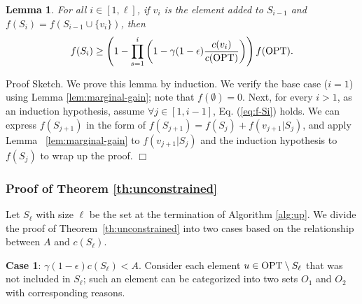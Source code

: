 \documentclass[10pt]{article} %
\newtheorem{lemma}[theorem]{Lemma}
\theoremstyle{remark}
\newcommand{\OPT}{{\rm OPT}}
\begin{document}
\begin{lemma}
\label{lem:f-Si}
For all $i\in [1,\ell]$, if $v_i$ is the element added to $S_{i-1}$ and $f(S_{i})=f(S_{i-1} \cup \{v_i\})$, then
\begin{equation}
    \label{eq:f-Si}
    f(S_{i}) \geq \left(   1- \prod_{s=1}^{i} \left(1- \gamma(1-\epsilon) \frac{c(v_i)}{c(\OPT)} \right)   \right) f(\OPT).
\end{equation}
\end{lemma}

{\sc Proof Sketch.}
We prove this lemma by induction. We verify the base case ($i=1$) using Lemma \ref{lem:marginal-gain}; note that
$f(\emptyset) = 0$. Next, for every $i>1$, as an induction hypothesis, assume $\forall j \in [1, i-1]$, Eq. (\ref{eq:f-Si}) holds. We can express $f(S_{j+1})$ in the form of $f(S_{j+1}) = f(S_j)+f(v_{j+1}|S_j)$, and apply Lemma ~\ref{lem:marginal-gain} to $f(v_{j+1}|S_j)$ and the induction hypothesis to $f(S_j)$ to wrap up the proof. \hfill $\Box$


\subsubsection{Proof of Theorem \ref{th:unconstrained} }

Let $S_\ell$ with size $\ell$ be the set at the termination of Algorithm \ref{alg:up}. We divide the proof of Theorem~\ref{th:unconstrained} into two cases based on the relationship between $A$ and $c(S_\ell)$. 


\textbf{Case 1}: $\gamma (1-\epsilon)c(S_\ell) < A$.
    Consider each element $u \in \OPT \setminus S_\ell$ that was not included in $S_\ell$; such an element can be categorized into two sets $O_1$ and $O_2$ with corresponding reasons.
    
\end{document}
